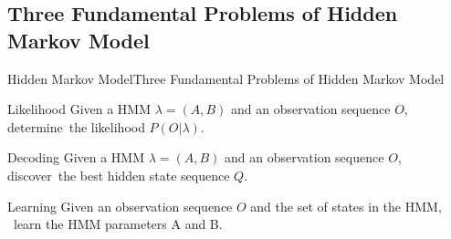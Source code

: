\documentclass[10pt]{beamer}
\begin{document}
\subsection{Three Fundamental Problems of Hidden Markov Model}
\begin{frame}{Hidden Markov Model}{Three Fundamental Problems of Hidden Markov Model}
   \begin{block}{Likelihood}
       Given a HMM $\lambda=(A,B)$ and an observation sequence $O$, determine\
       the likelihood $P(O|\lambda)$.
   \end{block}
   \begin{block}{Decoding}
       Given a HMM $\lambda=(A,B)$ and an observation sequence $O$, discover\
       the best hidden state sequence $Q$.
   \end{block}
   \begin{block}{Learning}
       Given an observation sequence $O$ and the set of states in the HMM, \
       learn the HMM parameters A and B.
   \end{block}
\end{frame}

\end{document}
